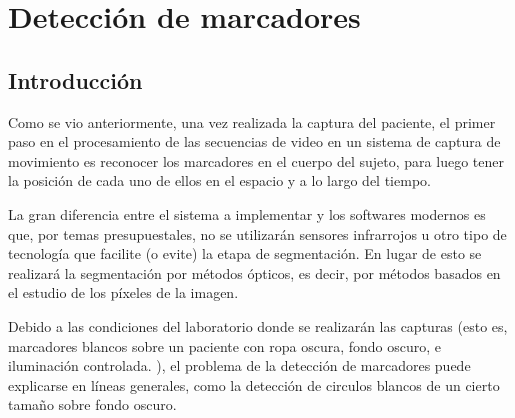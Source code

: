 \section{Detección de marcadores}
\label{deteccionMarcadoresSec}
\subsection{Introducción}

Como se vio anteriormente, una vez realizada la captura del paciente, el primer paso en el procesamiento de las secuencias de video en un sistema de captura de movimiento es reconocer los marcadores en el cuerpo del sujeto, para luego tener la posición de cada uno de ellos en el espacio y a lo largo del tiempo. 

La gran diferencia entre el sistema a implementar y los softwares modernos es que, por temas presupuestales, no se utilizarán sensores infrarrojos u otro tipo de tecnología que facilite (o evite) la etapa de segmentación. En lugar de esto se realizará la segmentación por métodos ópticos, es decir, por métodos basados en el estudio de los píxeles de la imagen. 

Debido a las condiciones del laboratorio donde se realizarán las capturas (esto es, marcadores blancos sobre un paciente con ropa oscura, fondo oscuro, e iluminación controlada. ), el problema de la detección de marcadores puede explicarse en líneas generales, como la detección de circulos blancos de un cierto tamaño sobre fondo oscuro.

